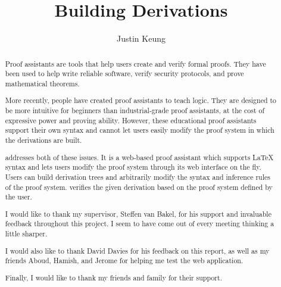 \documentclass[a4paper, twoside, 11pt]{report}
\title{Building Derivations}
\author{Justin Keung}
\begin{document}


\begin{abstract}
Proof assistants are tools that help users create and verify formal proofs. They have been used to help write reliable software, verify security protocols, and prove mathematical theorems.

More recently, people have created proof assistants to teach logic. They are designed to be more intuitive for beginners than industrial-grade proof assistants, at the cost of expressive power and proving ability. However, these educational proof assistants  support their own syntax and cannot let users easily modify the proof system in which the derivations are built.

\projectname{} addresses both of these issues. It is a web-based proof assistant which supports \LaTeX{} syntax and lets users modify the proof system through its web interface on the fly. Users can build derivation trees and arbitrarily modify the syntax and inference rules of the proof system. \projectname{} verifies the given derivation based on the proof system defined by the user.

\end{abstract}

\renewcommand{\abstractname}{Acknowledgements}
\begin{abstract}
I would like to thank my supervisor, Steffen van Bakel, for his support and invaluable feedback throughout this project. I seem to have come out of every meeting thinking a little sharper.

I would also like to thank David Davies for his feedback on this report, as well as my friends Aboud, Hamish, and Jerome for helping me test the web application.

Finally, I would like to thank my friends and family for their support.
\end{abstract}

\pagestyle{toc}
\tableofcontents
\listoffigures

\pagestyle{fancy}






% 

\DeclareRobustCommand{\VAN}[3]{#3}
\printbibliography[heading=bibintoc, title={Bibliography}]

\pagebreak

\end{document}

